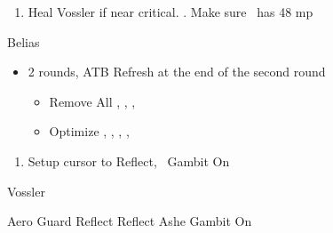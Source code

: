 \begin{enumerate}
	\item Heal Vossler if near critical. . Make sure \penelo\ has 48 mp
\end{enumerate}
\begin{battle}{Belias}
	\begin{itemize}
		\vaanf Reflect Vossler, then pick up chest
		\vaanf Reflect \vaan
		\item 2 rounds, ATB Refresh at the end of the second round
		      \begin{equip}
			      \begin{itemize}
				      \item Remove All \vaan, \penelo, \ashe, \basch
				      \item Optimize \basch, \balthier, \vaan, \ashe, \penelo
			      \end{itemize}
		      \end{equip}
	\end{itemize}
\end{battle}
\begin{enumerate}
	\item Setup cursor to Reflect, \penelo\ Gambit On
\end{enumerate}
\begin{battle}{Vossler}
	\begin{itemize}
		\ashef Aero Guard
		\vaanf Reflect \vaan
		\penelof Reflect Ashe
		\ashef Gambit On
	\end{itemize}
\end{battle}